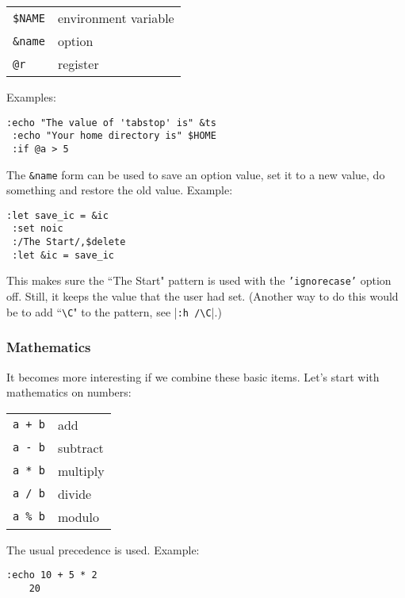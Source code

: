 \begin{center} \begin{tabular}{l l}
				\texttt{\$NAME} & environment variable \\
				\texttt{\&name} & option \\
				\texttt{@r} & register \\
\end{tabular} \end{center}

Examples:

\begin{Verbatim}[samepage=true]
 :echo "The value of 'tabstop' is" &ts
 :echo "Your home directory is" $HOME
 :if @a > 5
\end{Verbatim}

The \texttt{\&name} form can be used to save an option value, set it to a new value, do something and restore the old value.
Example:

\begin{Verbatim}[samepage=true]
 :let save_ic = &ic
 :set noic
 :/The Start/,$delete
 :let &ic = save_ic
\end{Verbatim}

This makes sure the ``The Start" pattern is used with the \texttt{'ignorecase'} option off.
Still, it keeps the value that the user had set.
(Another way to do this would be to add ``\texttt{\textbackslash{}C}" to the pattern, see |\texttt{:h /\textbackslash{}C}|.)

\subsubsection{Mathematics}
It becomes more interesting if we combine these basic items.
Let's start with mathematics on numbers:

\begin{center} \begin{tabular}{l l}
				\texttt{a + b} & add \\
				\texttt{a - b} & subtract \\
				\texttt{a * b} & multiply \\
				\texttt{a / b} & divide \\
				\texttt{a \% b} & modulo \\
\end{tabular} \end{center}

The usual precedence is used.
Example:

\begin{Verbatim}[samepage=true]
 :echo 10 + 5 * 2
    20
\end{Verbatim}

